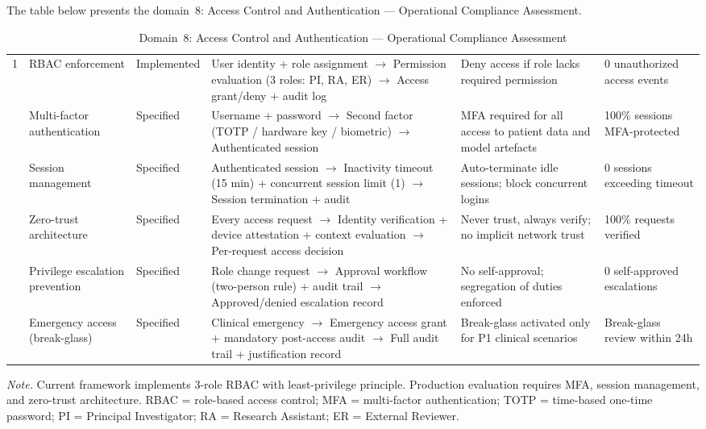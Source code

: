 \noindent The table below presents the domain~8: Access Control and Authentication --- Operational Compliance Assessment.

\begin{table}[H]
\tablestripes
\tablefontsize
\caption[Access Control and Authentication Assessment]{Domain~8: Access Control and Authentication --- Operational Compliance Assessment}
\begin{tabularx}{\textwidth}{@{} p{0.4cm} p{2cm} p{1.4cm} L L p{1.8cm} @{}}
\toprule
\thead{\#} &  &  &  &  &  \\
 & RBAC enforcement & Implemented & User identity + role assignment $\to$ Permission evaluation (3 roles: PI, RA, ER) $\to$ Access grant/deny + audit log & Deny access if role lacks required permission & 0 unauthorized access events \\
 & Multi-factor authentication & Specified & Username + password $\to$ Second factor (TOTP / hardware key / biometric) $\to$ Authenticated session & MFA required for all access to patient data and model artefacts & 100\% sessions MFA-protected \\
 & Session management & Specified & Authenticated session $\to$ Inactivity timeout (15 min) + concurrent session limit (1) $\to$ Session termination + audit & Auto-terminate idle sessions; block concurrent logins & 0 sessions exceeding timeout \\
 & Zero-trust architecture & Specified & Every access request $\to$ Identity verification + device attestation + context evaluation $\to$ Per-request access decision & Never trust, always verify; no implicit network trust & 100\% requests verified \\
 & Privilege escalation prevention & Specified & Role change request $\to$ Approval workflow (two-person rule) + audit trail $\to$ Approved/denied escalation record & No self-approval; segregation of duties enforced & 0 self-approved escalations \\
 & Emergency access (break-glass) & Specified & Clinical emergency $\to$ Emergency access grant + mandatory post-access audit $\to$ Full audit trail + justification record & Break-glass activated only for P1 clinical scenarios & Break-glass review within 24h \\
\bottomrule
\end{tabularx}
\vspace{0.5em}\noindent\textit{Note.} Current framework implements 3-role RBAC with least-privilege principle. Production evaluation requires MFA, session management, and zero-trust architecture. RBAC = role-based access control; MFA = multi-factor authentication; TOTP = time-based one-time password; PI = Principal Investigator; RA = Research Assistant; ER = External Reviewer.
\end{table}
\fi

